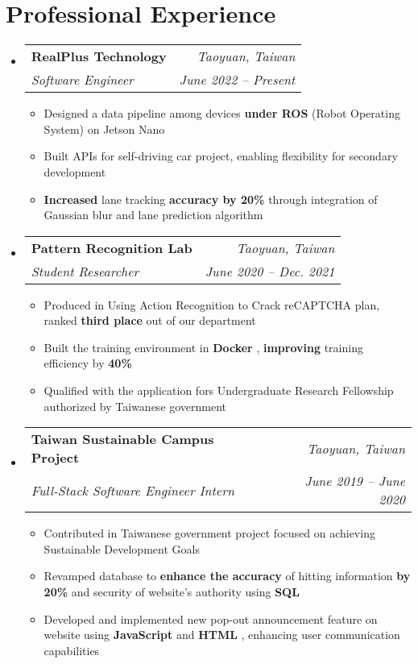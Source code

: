 \documentclass[letterpaper,11pt]{article}
\makeatletter
\newcommand{\HL}[1]{
  \textbf{\textcolor{DukeBlue}{#1}}
}
\newcommand{\subheadingtitlevspace}{
\vspace{-3pt}
}
\newcommand{\resumeItem}[1]{
  \item{
    {#1}\vspace{-4pt}
  }
}
\newcommand{\titleItem}[1]{
  \textbf{#1}
}
\newcommand{\resumeExpHeading}[4]{
    \item
    \begin{tabular*}{0.97\textwidth}{l@{\extracolsep{\fill}}r}
      \titleItem{#1} & \textit{ #2} \\
      \textit{#3} & \textit{ #4}
    \end{tabular*}\vspace{-8pt}
}
\newcommand{\resumeProjectHeading}[2]{
    \item
    \begin{tabular*}{0.97\textwidth}{l@{\extracolsep{\fill}}r}
      #1 & \textit{ #2}
    \end{tabular*}\vspace{-8pt}
}
\newcommand{\resumeSubHeadingListStart}{\subheadingtitlevspace\begin{itemize}[leftmargin=0in, label={}]}
\newcommand{\resumeSubHeadingListEnd}{\end{itemize}}
\newcommand{\resumeItemListStart}{
\begin{itemize}[label={$\bullet$}, labelsep=8pt, itemsep=4pt]}
\newcommand{\resumeItemListEnd}{
\end{itemize}\vspace{-8pt}}
\makeatother
\begin{document}
\section{Professional Experience}
  \resumeSubHeadingListStart
    \resumeExpHeading
      {RealPlus Technology}{Taoyuan, Taiwan}{Software Engineer}{June 2022 -- Present}
      \resumeItemListStart
        \resumeItem{Designed a data pipeline among devices \HL{under ROS} (Robot Operating System) on Jetson Nano}
        \resumeItem{Built APIs for self-driving car project, enabling flexibility for secondary development}
        \resumeItem{\HL{Increased} lane tracking \HL{accuracy by 20\%} through integration of Gaussian blur and lane prediction algorithm}
      \resumeItemListEnd
    \resumeExpHeading
      {Pattern Recognition Lab}{Taoyuan, Taiwan}{Student Researcher}{June 2020 -- Dec. 2021}
      \resumeItemListStart
        \resumeItem{Produced in Using Action Recognition to Crack reCAPTCHA plan, ranked \HL{third place} out of our department}
        \resumeItem{Built the training environment in \HL{Docker}, \HL{improving} training efficiency by \HL{40\%}}
        \resumeItem{Qualified with the application fors Undergraduate Research Fellowship authorized by Taiwanese government}
      \resumeItemListEnd
    \resumeExpHeading
      {Taiwan Sustainable Campus Project}{Taoyuan, Taiwan}{Full-Stack Software Engineer Intern}{June 2019 -- June 2020}
      \resumeItemListStart
        \resumeItem{Contributed in Taiwanese government project focused on achieving Sustainable Development Goals}
        \resumeItem{Revamped database to \HL{enhance the accuracy} of hitting information \HL{by 20\%} and security of website’s authority using \HL{SQL}}
        \resumeItem{Developed and implemented new pop-out announcement feature on website using \HL{JavaScript} and \HL{HTML}, enhancing user communication capabilities}
      \resumeItemListEnd
  \resumeSubHeadingListEnd


\end{document}
